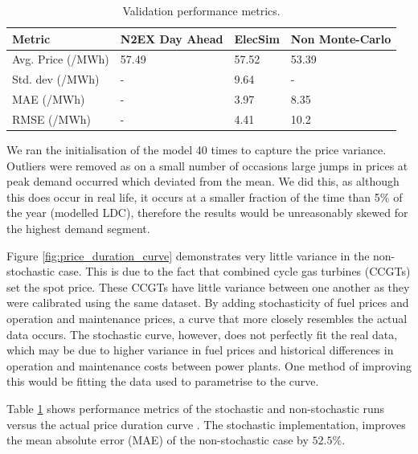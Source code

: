 

\begin{table}[]
	\begin{tabular}{p{4cm}p{4cm}p{2.5cm}p{3cm}}
		\hline
		Metric & N2EX Day Ahead & ElecSim & Non Monte-Carlo \\ \hline
		Avg. Price (\textsterling/MWh) & 57.49 & 57.52 & 53.39 \\
		Std. dev (\textsterling/MWh) & - & 9.64 & - \\
		MAE (\textsterling/MWh) & - & 3.97 & 8.35 \\
		RMSE (\textsterling/MWh) & - & 4.41 & 10.2 \\ \hline
	\end{tabular}
	\caption{Validation performance metrics.}
	\label{table:validation_metrics}
\end{table}


We ran the initialisation of the model 40 times to capture the price variance. Outliers were removed as on a small number of occasions large jumps in prices at peak demand occurred which deviated from the mean. We did this, as although this does occur in real life, it occurs at a smaller fraction of the time than 5\% of the year (modelled LDC), therefore the results would be unreasonably skewed for the highest demand segment. 

Figure \ref{fig:price_duration_curve} demonstrates very little variance in the non-stochastic case. This is due to the fact that combined cycle gas turbines (CCGTs) set the spot price. These CCGTs have little variance between one another as they were calibrated using the same dataset. By adding stochasticity of fuel prices and operation and maintenance prices, a curve that more closely resembles the actual data occurs. The stochastic curve, however, does not perfectly fit the real data, which may be due to higher variance in fuel prices and historical differences in operation and maintenance costs between power plants. One method of improving this would be fitting the data used to parametrise to the curve.

Table \ref{table:validation_metrics} shows performance metrics of the stochastic and non-stochastic runs versus the actual price duration curve . The stochastic implementation, improves the mean absolute error (MAE) of the non-stochastic case by $52.5\%$.


